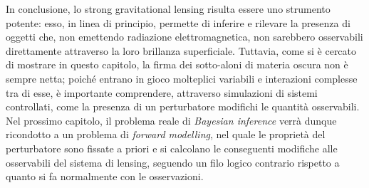In conclusione, lo strong gravitational lensing risulta essere uno strumento potente: esso, in linea di principio, permette di inferire e rilevare la presenza di oggetti che, non emettendo radiazione elettromagnetica, non sarebbero osservabili direttamente attraverso la loro brillanza superficiale. Tuttavia, come si è cercato di mostrare in questo capitolo, la firma dei sotto-aloni di materia oscura non è sempre netta; poiché entrano in gioco molteplici variabili e interazioni complesse tra di esse, è importante comprendere, attraverso simulazioni di sistemi controllati, come la presenza di un perturbatore modifichi le quantità osservabili. Nel prossimo capitolo, il problema reale di \emph{Bayesian inference} verrà dunque ricondotto a un problema di \emph{forward modelling}, nel quale le proprietà del perturbatore sono fissate a priori e si calcolano le conseguenti modifiche alle osservabili del sistema di lensing, seguendo un filo logico contrario rispetto a quanto si fa normalmente con le osservazioni. 